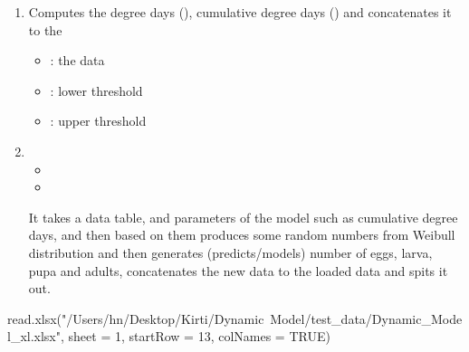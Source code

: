 \begin{enumerate}
\item {}

Computes the degree days (), cumulative degree days () and concatenates it to the 

\begin{itemize}
\item {}: the data
\item {}: lower threshold
\item {}: upper threshold
\end{itemize}

 

\item {}

\begin{itemize}
\item {}

\item {}
\end{itemize}

It takes a data table, and parameters of the model such as cumulative 
degree days, and then
based on them produces some random numbers from Weibull
distribution and then generates (predicts/models) number of eggs,
larva, pupa and adults, concatenates the new data to the loaded data
and spits it out.


\end{enumerate}

read.xlsx("/Users/hn/Desktop/Kirti/Dynamic\ Model/test_data/Dynamic_Model_xl.xlsx", sheet = 1, startRow = 13, colNames = TRUE)